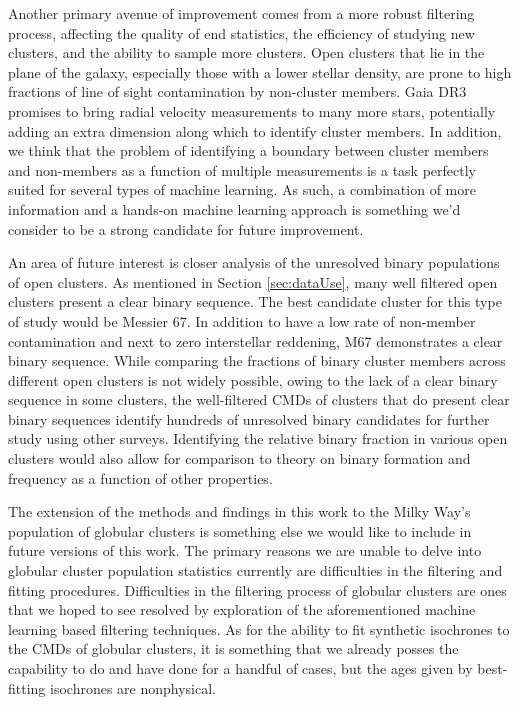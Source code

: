 \documentclass[onecolumn,table,xcdraw,super]{aastex631}
\begin{document}
Another primary avenue of improvement comes from a more robust filtering process, affecting the quality of end statistics, the efficiency of studying new clusters, and the ability to sample more clusters. Open clusters that lie in the plane of the galaxy, especially those with a lower stellar density, are prone to high fractions of line of sight contamination by non-cluster members. Gaia DR3 promises to bring radial velocity measurements to many more stars, potentially adding an extra dimension along which to identify cluster members. In addition, we think that the problem of identifying a boundary between cluster members and non-members as a function of multiple measurements is a task perfectly suited for several types of machine learning. As such, a combination of more information and a hands-on machine learning approach is something we'd consider to be a strong candidate for future improvement.

An area of future interest is closer analysis of the unresolved binary populations of open clusters. As mentioned in Section \ref{sec:dataUse}, many well filtered open clusters present a clear binary sequence. The best candidate cluster for this type of study would be Messier 67. In addition to have a low rate of non-member contamination and next to zero interstellar reddening, M67 demonstrates a clear binary sequence. While comparing the fractions of binary cluster members across different open clusters is not widely possible, owing to the lack of a clear binary sequence in some clusters, the well-filtered CMDs of clusters that do present clear binary sequences identify hundreds of unresolved binary candidates for further study using other surveys. Identifying the relative binary fraction in various open clusters would also allow for comparison to theory on binary formation and frequency as a function of other properties.

The extension of the methods and findings in this work to the Milky Way's population of globular clusters is something else we would like to include in future versions of this work. The primary reasons we are unable to delve into globular cluster population statistics currently are difficulties in the filtering and fitting procedures. Difficulties in the filtering process of globular clusters are ones that we hoped to see resolved by exploration of the aforementioned machine learning based filtering techniques. As for the ability to fit synthetic isochrones to the CMDs of globular clusters, it is something that we already posses the capability to do and have done for a handful of cases, but the ages given by best-fitting isochrones are nonphysical.
\end{document}
